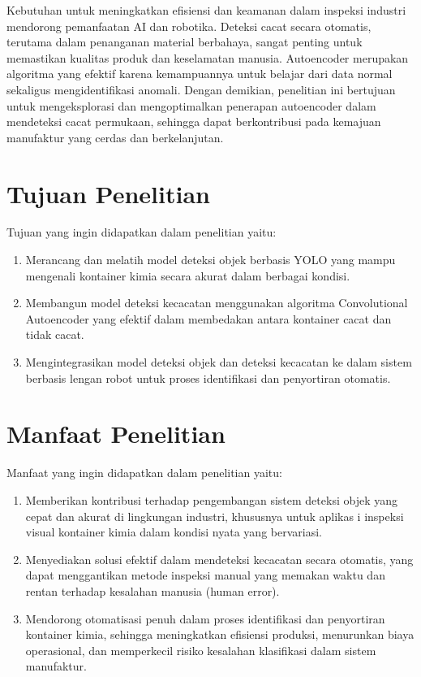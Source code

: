 Kebutuhan untuk meningkatkan efisiensi dan keamanan dalam inspeksi
industri mendorong pemanfaatan AI dan robotika. Deteksi cacat secara
otomatis, terutama dalam penanganan material berbahaya, sangat
penting untuk memastikan kualitas produk dan keselamatan manusia.
Autoencoder merupakan algoritma yang efektif karena kemampuannya
untuk belajar dari data normal sekaligus mengidentifikasi anomali.
Dengan demikian, penelitian ini bertujuan untuk mengeksplorasi dan
mengoptimalkan penerapan autoencoder dalam mendeteksi cacat
permukaan, sehingga dapat berkontribusi pada kemajuan manufaktur yang
cerdas dan berkelanjutan.

\vspace{1em}

\section{Tujuan Penelitian}
Tujuan yang ingin didapatkan dalam penelitian yaitu:
\begin{enumerate}
  \item Merancang dan melatih model deteksi objek berbasis YOLO yang
    mampu mengenali kontainer kimia secara akurat dalam berbagai kondisi.
  \item Membangun model deteksi kecacatan menggunakan algoritma
    Convolutional Autoencoder yang efektif dalam membedakan antara
    kontainer cacat dan tidak cacat.
  \item Mengintegrasikan model deteksi objek dan deteksi kecacatan ke
    dalam sistem berbasis lengan robot untuk proses identifikasi dan
    penyortiran otomatis.
\end{enumerate}

\vspace{1em}

\section{Manfaat Penelitian}
Manfaat yang ingin didapatkan dalam penelitian yaitu:
\begin{enumerate}
  \item Memberikan kontribusi terhadap pengembangan sistem deteksi
    objek yang cepat dan akurat di lingkungan industri, khususnya
    untuk aplikas i inspeksi visual kontainer kimia dalam kondisi
    nyata yang bervariasi.
  \item Menyediakan solusi efektif dalam mendeteksi kecacatan secara
    otomatis, yang dapat menggantikan metode inspeksi manual yang
    memakan waktu dan rentan terhadap kesalahan manusia (human error).
  \item Mendorong otomatisasi penuh dalam proses identifikasi dan
    penyortiran kontainer kimia, sehingga meningkatkan efisiensi
    produksi, menurunkan biaya operasional, dan memperkecil risiko
    kesalahan klasifikasi dalam sistem manufaktur.
\end{enumerate}
